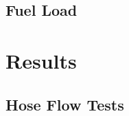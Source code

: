 \documentclass[12pt,oneside]{book}
\begin{document}
\section{Fuel Load}

\chapter{Results}
\label{chap:Results}

\section{Hose Flow Tests}

%
%
%
%
%
%
%
%
%
%
\end{document}
